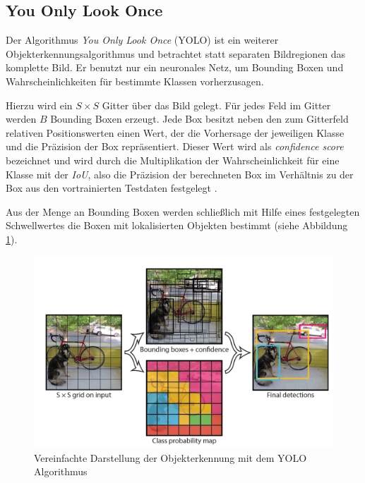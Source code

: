\subsection*{You Only Look Once}

Der Algorithmus \textit{You Only Look Once} (YOLO) ist ein weiterer Objekterkennungsalgorithmus und betrachtet statt separaten Bildregionen das komplette Bild. Er benutzt nur ein neuronales Netz, um Bounding Boxen und Wahrscheinlichkeiten für bestimmte Klassen vorherzusagen.

Hierzu wird ein $S \times S$ Gitter über das Bild gelegt. Für jedes Feld im Gitter werden $B$ Bounding Boxen erzeugt. Jede Box besitzt neben den zum Gitterfeld relativen Positionswerten einen Wert, der die Vorhersage der jeweiligen Klasse und die Präzision der Box repräsentiert. Dieser Wert wird als \textit{confidence score} bezeichnet und wird durch die Multiplikation der Wahrscheinlichkeit für eine Klasse mit der \textit{IoU}, also die Präzision der berechneten Box im Verhältnis zu der Box aus den vortrainierten Testdaten festgelegt \cite{JosephRedmon.2016}.

Aus der Menge an Bounding Boxen werden schließlich mit Hilfe eines festgelegten Schwellwertes die Boxen mit lokalisierten Objekten bestimmt (siehe Abbildung \ref{yolo_model}).

\begin{figure}[ht]
	\begin{center}
		\includegraphics[width=15cm]{Bilder/yolo_model.png} 
		\caption{Vereinfachte Darstellung der Objekterkennung mit dem YOLO Algorithmus \cite{JosephRedmon.2016}}
		\label{yolo_model}
	\end{center}
\end{figure}

